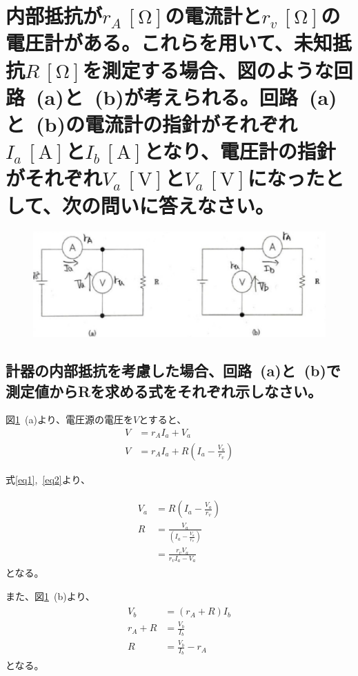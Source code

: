 \documentclass[a4paper,11pt]{jsarticle}
\begin{document}
\section{内部抵抗が$r_ {A}\mathrm{\,[\si{\ohm }]}$の電流計と$r_ {v}\mathrm{\,[\si{\ohm}]}$の電圧計がある。これらを用いて、未知抵抗$R\mathrm{\,[\si{\ohm}]}$を測定する場合、図のような回路~(a)と~(b)が考えられる。回路~(a)と~(b)の電流計の指針がそれぞれ$I_{a}\mathrm{\,[\si{\ampere}]}$と$I_{b}\mathrm{\,[\si{\ampere}]}$となり、電圧計の指針がそれぞれ$V_{a}\mathrm{\,[\si{\volt}]}$と$V_{a}\mathrm{\,[\si{\volt}]}$になったとして、次の問いに答えなさい。}
\begin{figure}[htbp]
  \centering
  \includegraphics[width=15cm]{fig3.eps}
  \caption{}\label{fig1}
\end{figure}

\subsection{計器の内部抵抗を考慮した場合、回路~(a)と~(b)で測定値からRを求める式をそれぞれ示しなさい。}
図\ref{fig1}~(a)より、電圧源の電圧を$V$とすると、
\begin{align}
  V&=r_{A}I_{a}+V_{a}\label{eq1}\\
  V&=r_{A}I_{a}+R\left(I_{a}-\frac{V_{a}}{r_{v}}\right)\label{eq2}
\end{align}

式\eqref{eq1},~\eqref{eq2}より、

\begin{align}
  \begin{split}
  V_{a}
  &=R\left(I_{a}-\frac{V_{a}}{r_{v}}\right)\\
  R
  &=\frac{V_{a}}{\left(I_{a}-\frac{V_{a}}{r_{v}}\right)}\\
  &=\frac{r_{v}V_{a}}{r_{v}I_{a}-V_{a}}
  \end{split}\label{eq3}
\end{align}
となる。

また、図\ref{fig1}~(b)より、
\begin{align}
  \begin{split}
    V_{b}
    &=(r_{A}+R)I_{b}\\
    r_{A}+R
    &=\frac{V_{b}}{I_{b}}\\
    R
    &=\frac{V_{b}}{I_{b}}-r_{A}
  \end{split}\label{eq4}
\end{align}
となる。
\end{document}
